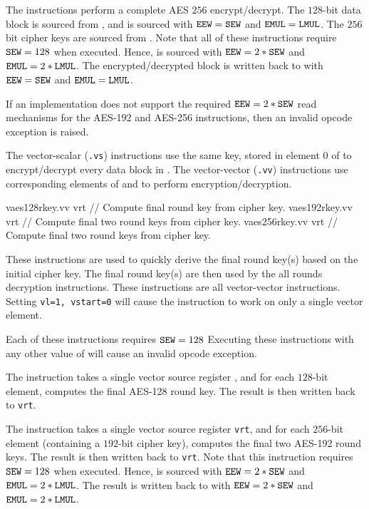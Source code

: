 The  instructions perform a complete
AES $256$ encrypt/decrypt.
The $128$-bit data block is sourced from \vrt, and is sourced with
${\tt EEW}={\tt SEW}$ and ${\tt EMUL}={\tt LMUL}$.
The $256$ bit cipher keys are sourced from .
Note that all of these instructions require ${\tt SEW}=128$ when executed.
Hence,  is sourced with ${\tt EEW}=2*{\tt SEW}$ and ${\tt EMUL}=2*{\tt LMUL}$.
The encrypted/decrypted block is written back to \vrt with
${\tt EEW}={\tt SEW}$ and ${\tt EMUL}={\tt LMUL}$.

If an implementation does not support the required ${\tt EEW}=2*{\tt SEW}$
read mechanisms for the AES-192 and AES-256 instructions, then an invalid
opcode exception is raised.

The vector-scalar ({\tt *.vs}) instructions use the same key, stored
in element $0$ of  to encrypt/decrypt every data block in \vrt.
The vector-vector ({\tt *.vv}) instructions use corresponding elements
of  and \vrt to perform encryption/decryption.

\begin{cryptoisa}
vaes128rkey.vv vrt    // Compute final round key from cipher key.
vaes192rkey.vv vrt    // Compute final two round keys from cipher key.
vaes256rkey.vv vrt    // Compute final two round keys from cipher key.
\end{cryptoisa}

These instructions are used to quickly derive the final round key(s)
based on the initial cipher key.
The final round key(s) are then used by the all rounds decryption
instructions.
These instructions are all vector-vector instructions.
Setting {\tt vl=1, vstart=0} will cause the instruction to work on only a
single vector element.

Each of these instructions requires ${\tt SEW}=128$
Executing these instructions with any other value of \SEW will cause
an invalid opcode exception.

The  instruction takes a single
vector source register \vrt, and for each $128$-bit element, computes
the final AES-128 round key.
The result is then written back to {\tt vrt}.

The  instruction takes a single
vector source register {\tt vrt}, and for each $256$-bit element
(containing a $192$-bit cipher key),
computes the final two AES-192 round keys.
The result is then written back to {\tt vrt}.
Note that this instruction requires ${\tt SEW}=128$ when executed.
Hence, \vrt is sourced with ${\tt EEW}=2*{\tt SEW}$ and ${\tt EMUL}=2*{\tt LMUL}$.
The result is written back to \vrt with
${\tt EEW}=2*{\tt SEW}$ and ${\tt EMUL}=2*{\tt LMUL}$.

